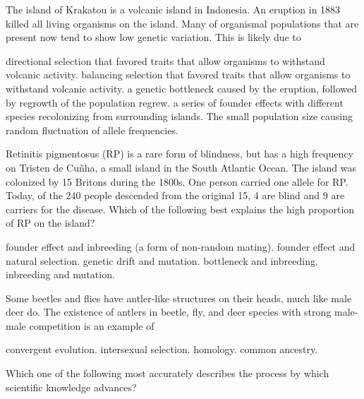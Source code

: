 \question
The island of Krakatou is a volcanic island in Indonesia.  An eruption in 1883 killed all living organisms on the island.  Many of organismal populations that are present now tend to show low genetic variation.  This is likely due to

\begin{choices}
\choice directional selection that favored traits that allow organisms to withstand volcanic activity. %
\choice balancing selection that favored traits that allow organisms to withstand volcanic activity. %
\choice a genetic bottleneck caused by the eruption, followed by regrowth of the population regrew. %
\correctchoice a series of founder effects with different species recolonizing from surrounding islands. %
\choice The small population size causing random fluctuation of allele frequencies. %
\end{choices}


\question
Retinitis pigmentosus (RP) is a rare form of blindness, but has a high frequency on Tristen de Cu\~nha, a small island in the South Atlantic Ocean.  The island was colonized by 15 Britons during the 1800s.  One person carried one allele for RP.  Today, of the 240 people descended from the original 15, 4 are blind and 9 are carriers for the disease.  Which of the following best explains the high proportion of RP on the island?

\begin{choices}
\correctchoice founder effect and inbreeding (a form of non-random mating).%
\choice founder effect and natural selection.%
\choice genetic drift and mutation.%
\choice bottleneck and inbreeding.%
\choice inbreeding and mutation.%
\end{choices}


\question
Some beetles and flies have antler-like structures on their heads, much like male deer do. The existence of antlers in beetle, fly, and deer species with strong male-male competition is an example of 

\begin{choices}
\correctchoice convergent evolution. %
\choice intersexual selection. %
\choice homology. %
\choice common ancestry. %
\end{choices}


\question
Which one of the following most accurately describes the process by which scientific knowledge advances? 

